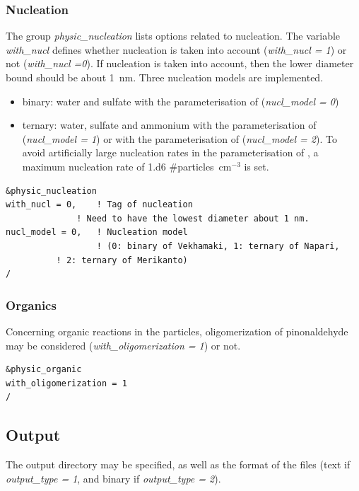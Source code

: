 \documentclass[a4paper,11pt]{article}
\begin{document}
\subsubsection{Nucleation}


The group {\textit{physic\_nucleation}} lists options related to nucleation. The variable {\textit{with\_nucl}} defines whether nucleation is taken into account ({\textit{with\_nucl = 1}}) or not ({\textit{with\_nucl =0}}). If nucleation is taken into account, then the lower diameter bound should be about 1~nm. Three nucleation models are implemented.
\begin{itemize}
\item binary: water and sulfate with the parameterisation of \cite{vehk} ({\textit{nucl\_model = 0}})
\item ternary: water, sulfate and ammonium with the parameterisation of \cite{napari} ({\textit{nucl\_model = 1}}) or with the parameterisation of \cite{merikantoa, merikantob} ({\textit{nucl\_model = 2}}).
To avoid artificially large nucleation rates in the parameterisation of \cite{napari}, a maximum nucleation rate of 1.d6 \#particles~cm$^{-3}$ is set.
\end{itemize}


\begin{verbatim}
&physic_nucleation
with_nucl = 0,    ! Tag of nucleation 
	    	  ! Need to have the lowest diameter about 1 nm.
nucl_model = 0,   ! Nucleation model 
                  ! (0: binary of Vekhamaki, 1: ternary of Napari, 
		  ! 2: ternary of Merikanto)
/
\end{verbatim} 

\subsubsection{Organics}

Concerning organic reactions in the particles, oligomerization of pinonaldehyde may be considered ({\textit{with\_oligomerization = 1}}) or not.


\begin{verbatim}
&physic_organic
with_oligomerization = 1      
/
\end{verbatim}


\subsection{Output}

The output directory may be specified, as well as the format of the files (text if {\textit{output\_type = 1}}, and binary if {\textit{output\_type = 2}}).
 
\end{document}
